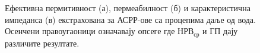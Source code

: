 \begin{figure}[!t]
{\label{fig10b}}
\caption{Ефективна пермитивност (а), пермеабилност (б) и карактеристична импеданса (в) екстрахована за АСРР-ове са процепима даље од вода. Осенчени правоугаоници означавају опсеге где $НРВ_{ср}$ и ГП дају различите резултате.}
\label{fig10}
\end{figure} 


